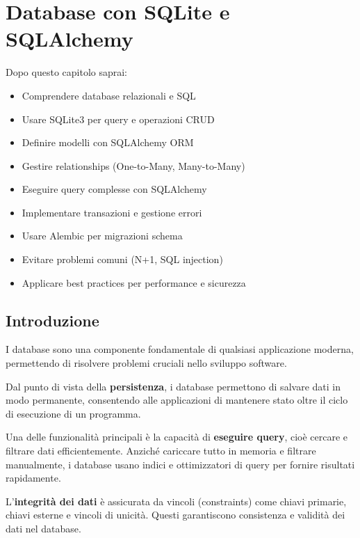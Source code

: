 \chapter{Database con SQLite e SQLAlchemy}

\begin{tcolorbox}[title=Obiettivi del capitolo]
Dopo questo capitolo saprai:
\begin{itemize}
  \item Comprendere database relazionali e SQL
  \item Usare SQLite3 per query e operazioni CRUD
  \item Definire modelli con SQLAlchemy ORM
  \item Gestire relationships (One-to-Many, Many-to-Many)
  \item Eseguire query complesse con SQLAlchemy
  \item Implementare transazioni e gestione errori
  \item Usare Alembic per migrazioni schema
  \item Evitare problemi comuni (N+1, SQL injection)
  \item Applicare best practices per performance e sicurezza
\end{itemize}
\end{tcolorbox}

\section{Introduzione}

I database sono una componente fondamentale di qualsiasi applicazione moderna, permettendo di risolvere problemi cruciali nello sviluppo software.

Dal punto di vista della \textbf{persistenza}, i database permettono di salvare dati in modo permanente, consentendo alle applicazioni di mantenere stato oltre il ciclo di esecuzione di un programma.

Una delle funzionalità principali è la capacità di \textbf{eseguire query}, cioè cercare e filtrare dati efficientemente. Anziché cariccare tutto in memoria e filtrare manualmente, i database usano indici e ottimizzatori di query per fornire risultati rapidamente.

L'\textbf{integrità dei dati} è assicurata da vincoli (constraints) come chiavi primarie, chiavi esterne e vincoli di unicità. Questi garantiscono consistenza e validità dei dati nel database.

